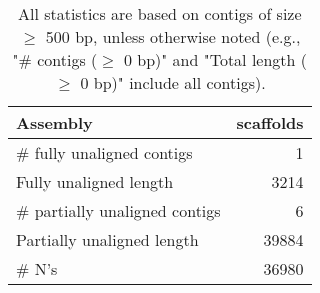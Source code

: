 \documentclass[12pt,a4paper]{article}
\begin{document}
\begin{table}[ht]
\begin{center}
\caption{All statistics are based on contigs of size $\geq$ 500 bp, unless otherwise noted (e.g., "\# contigs ($\geq$ 0 bp)" and "Total length ($\geq$ 0 bp)" include all contigs).}
\begin{tabular}{|l*{1}{|r}|}
\hline
Assembly & scaffolds \\ \hline
\# fully unaligned contigs & 1 \\ \hline
Fully unaligned length & 3214 \\ \hline
\# partially unaligned contigs & 6 \\ \hline
Partially unaligned length & 39884 \\ \hline
\# N's & 36980 \\ \hline
\end{tabular}
\end{center}
\end{table}
\end{document}
